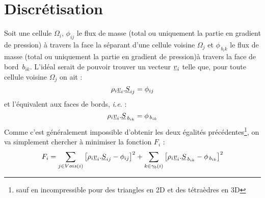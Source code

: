 %
%
%
%
%
%
%
%

\section{Discr\'etisation}
Soit une cellule $\Omega_i$, $\phi_{ij}$  le flux de masse (total ou uniquement la partie en
gradient de pression) \`a travers la face la
s\'eparant d'une cellule voisine $\Omega_j$ et $\phi_{\,b_ik}$ le flux de masse (total ou uniquement la partie en
gradient de pression)\`a travers la face de bord $\,b_{ik}$.
L'id\'eal serait de pouvoir trouver un vecteur $\underline{v}_i$ telle que, pour toute cellule voisine $\Omega_j$ on ait :
\begin{equation}
\rho_i\underline{v}_i.\underline{S}_{ij} = \phi_{ij}
\end{equation}
et l'\'equivalent aux faces de bords, {\it i.e.} :
\begin{equation}
\rho_i \underline{v}_i.\underline{S}_{\,b_{ik}} = \phi_{\,b_{ik}}
\end{equation}
Comme c'est g\'en\'eralement impossible d'obtenir les deux \'egalit\'es pr\'ec\'edentes\footnote{%
sauf en incompressible pour des triangles en 2D et des
t\'etra\`edres en 3D}, on va simplement chercher \`a minimiser la fonction $F_i$ :
\begin{equation}
F_i=\sum\limits_{j\in Vois(i)}\left[
\rho_i\underline{v}_i.\underline{S}_{ij}-\phi_{ij}\right]^2 + \sum\limits_{k\in {\gamma_b(i)}}\left[\rho_i\underline{v}_i.\underline{S}_{\,b_{ik}}-\phi_{\,b_{ik}}\right]^2
\end{equation}

